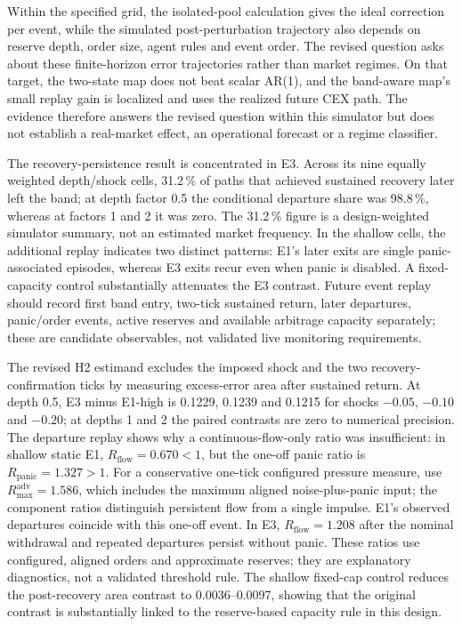 Within the specified grid, the isolated-pool calculation gives the ideal correction per event, while the simulated post-perturbation trajectory also depends on reserve depth, order size, agent rules and event order. The revised question asks about these finite-horizon error trajectories rather than market regimes. On that target, the two-state map does not beat scalar AR(1), and the band-aware map's small replay gain is localized and uses the realized future CEX path. The evidence therefore answers the revised question within this simulator but does not establish a real-market effect, an operational forecast or a regime classifier.

The recovery-persistence result is concentrated in E3. Across its nine equally weighted depth/shock cells, 31.2\,\% of paths that achieved sustained recovery later left the band; at depth factor 0.5 the conditional departure share was 98.8\,\%, whereas at factors 1 and 2 it was zero. The 31.2\,\% figure is a design-weighted simulator summary, not an estimated market frequency. In the shallow cells, the additional replay indicates two distinct patterns: E1's later exits are single panic-associated episodes, whereas E3 exits recur even when panic is disabled. A fixed-capacity control substantially attenuates the E3 contrast. Future event replay should record first band entry, two-tick sustained return, later departures, panic/order events, active reserves and available arbitrage capacity separately; these are candidate observables, not validated live monitoring requirements.

The revised H2 estimand excludes the imposed shock and the two recovery-confirmation ticks by measuring excess-error area after sustained return. At depth 0.5, E3 minus E1-high is 0.1229, 0.1239 and 0.1215 for shocks $-0.05$, $-0.10$ and $-0.20$; at depths 1 and 2 the paired contrasts are zero to numerical precision. The departure replay shows why a continuous-flow-only ratio was insufficient: in shallow static E1, $R_{\mathrm{flow}}=0.670<1$, but the one-off panic ratio is $R_{\mathrm{panic}}=1.327>1$. For a conservative one-tick configured pressure measure, use $R_{\max}^{\mathrm{adv}}=1.586$, which includes the maximum aligned noise-plus-panic input; the component ratios distinguish persistent flow from a single impulse. E1's observed departures coincide with this one-off event. In E3, $R_{\mathrm{flow}}=1.208$ after the nominal withdrawal and repeated departures persist without panic. These ratios use configured, aligned orders and approximate reserves; they are explanatory diagnostics, not a validated threshold rule. The shallow fixed-cap control reduces the post-recovery area contrast to 0.0036--0.0097, showing that the original contrast is substantially linked to the reserve-based capacity rule in this design.

